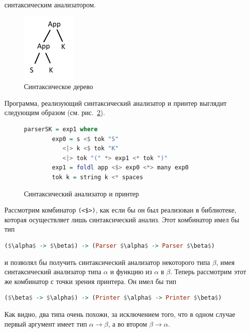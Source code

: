 синтаксическим анализатором.

\begin{figure}[h]
  \centering
  \includegraphics[scale = 0.9]{Aliev/AST.png}
  \caption{Синтаксическое дерево}
  \label{AST}
\end{figure}

Программа, реализующий синтаксический анализатор и принтер выглядит следующим образом (см. рис.~\ref{ppimpl}).

\begin{figure}[h]
\centering
\begin{lstlisting}[language=Haskell]
    parserSK = exp1 where
        exp0 = s <$ tok "S"
           <|> k <$ tok "K" 
           <|> tok "(" *> exp1 <* tok ")"
        exp1 = foldl app <$> exp0 <*> many exp0
        tok k = string k <* spaces    
\end{lstlisting}
\caption{Синтаксический анализатор и принтер}
\label{ppimpl}
\end{figure}

Рассмотрим комбинатор \lstinline{(<$>)}, как если бы он был реализован в библиотеке, 
которая осуществляет лишь синтаксический анализ. Этот комбинатор имел бы тип

\begin{lstlisting}[language=Haskell,mathescape]
   ($\alpha$ -> $\beta$) -> (Parser $\alpha$ -> Parser $\beta$)
\end{lstlisting}

\noindent и позволял бы получить синтаксический анализатор некоторого типа $\beta$, имея 
синтаксический анализатор типа $\alpha$ и функцию из $\alpha$ в $\beta$. Теперь 
рассмотрим этот же комбинатор с точки зрения принтера. Он имел бы тип 

\begin{lstlisting}[language=Haskell,mathescape]
   ($\beta$ -> $\alpha$) -> (Printer $\alpha$ -> Printer $\beta$)
\end{lstlisting}

Как видно, два типа очень похожи, за исключением того, что в одном случае первый аргумент имеет тип $\alpha \rightarrow \beta$, 
а во втором $\beta \rightarrow \alpha$.

